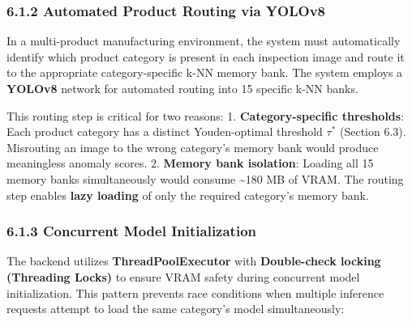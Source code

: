 \subsubsection{6.1.2 Automated Product Routing via YOLOv8}\label{automated-product-routing-via-yolov8}

In a multi-product manufacturing environment, the system must automatically identify which product category is present in each inspection image and route it to the appropriate category-specific k-NN memory bank. The system employs a \textbf{YOLOv8} network for automated routing into 15 specific k-NN banks.

This routing step is critical for two reasons: 1. \textbf{Category-specific thresholds}: Each product category has a distinct Youden-optimal threshold \(\tau^*\) (Section 6.3). Misrouting an image to the wrong category's memory bank would produce meaningless anomaly scores. 2. \textbf{Memory bank isolation}: Loading all 15 memory banks simultaneously would consume \textasciitilde180 MB of VRAM. The routing step enables \textbf{lazy loading} of only the required category's memory bank.

\subsubsection{6.1.3 Concurrent Model Initialization}\label{concurrent-model-initialization}

The backend utilizes \textbf{ThreadPoolExecutor} with \textbf{Double-check locking (Threading Locks)} to ensure VRAM safety during concurrent model initialization. This pattern prevents race conditions when multiple inference requests attempt to load the same category's model simultaneously:

\begin{Shaded}
\begin{Highlighting}[]
  
     
          
            \OperatorTok{=} 
\end{Highlighting}
\end{Shaded}

